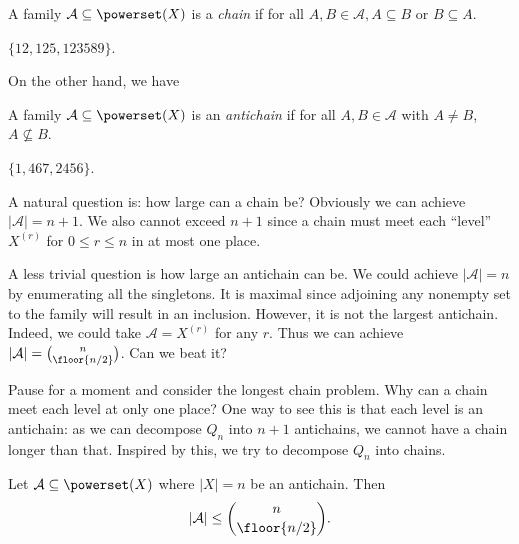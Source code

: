 \documentclass[a4paper]{article}
\begin{document}
\begin{definition}[chain]
  A family \(\mathcal A \subseteq \powerset (X)\) is a \emph{chain} if for all \(A, B \in \mathcal A, A \subseteq B \text{ or } B \subseteq A\).
\end{definition}

\begin{eg}
  \(\{12, 125, 123589\}\).
\end{eg}

On the other hand, we have

\begin{definition}[antichain]
  A family \(\mathcal A \subseteq \powerset (X)\) is an \emph{antichain} if for all \(A, B \in \mathcal A\) with \(A \neq B\), \(A \nsubseteq B\).
\end{definition}

\begin{eg}
  \(\{1, 467, 2456\}\).
\end{eg}

A natural question is: how large can a chain be? Obviously we can achieve \(|\mathcal A| = n + 1\). We also cannot exceed \(n + 1\) since a chain must meet each ``level'' \(X^{(r)}\) for \(0 \leq r \leq n\) in at most one place.

A less trivial question is how large an antichain can be. We could achieve \(|\mathcal A| = n\) by enumerating all the singletons. It is maximal since adjoining any nonempty set to the family will result in an inclusion. However, it is not the largest antichain. Indeed, we could take \(\mathcal A = X^{(r)}\) for any \(r\). Thus we can achieve \(|\mathcal A| = \binom{n}{\floor{n/2}}\). Can we beat it?

Pause for a moment and consider the longest chain problem. Why can a chain meet each level at only one place? One way to see this is that each level is an antichain: as we can decompose \(Q_n\) into \(n + 1\) antichains, we cannot have a chain longer than that. Inspired by this, we try to decompose \(Q_n\) into chains.

\begin{theorem}
  Let \(\mathcal A \subseteq \powerset(X)\) where \(|X| = n\) be an antichain. Then
  \[
    |\mathcal A| \leq \binom{n}{\floor{n/2}}.
  \]
\end{theorem}
\end{document}
